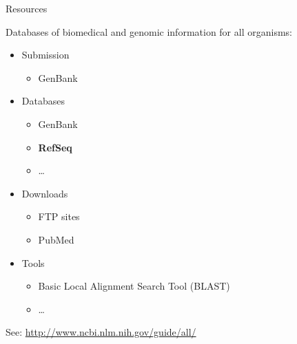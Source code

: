 \begin{frame}{Resources}

Databases of biomedical and genomic information for all organisms:

\begin{itemize}
\itemsep1pt\parskip0pt
\item
  Submission

  \begin{itemize}
  \itemsep1pt\parskip0pt
  \item
    GenBank
  \end{itemize}
\item
  Databases

  \begin{itemize}
  \itemsep1pt\parskip0pt
  \item
    GenBank
  \item
    \textbf{RefSeq}
  \item
    \ldots{}
  \end{itemize}
\item
  Downloads

  \begin{itemize}
  \itemsep1pt\parskip0pt
  \item
    FTP sites
  \item
    PubMed
  \end{itemize}
\item
  Tools

  \begin{itemize}
  \itemsep1pt\parskip0pt
  \item
    Basic Local Alignment Search Tool (BLAST)
  \item
    \ldots{}
  \end{itemize}
\end{itemize}

See: \url{http://www.ncbi.nlm.nih.gov/guide/all/}

\end{frame}

